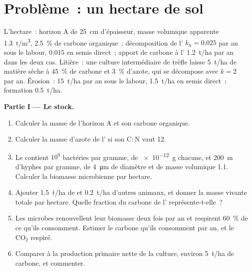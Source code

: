 \section{Problème~: un hectare de sol}

\begin{problem}
\label{pb:b2:living-soil:1}
L'hectare~: horizon A de \qty{25}{cm} d'épaisseur, masse volumique
apparente \qty{1.3}{t/m^3}, \qty{2.5}{\%} de carbone organique~;
décomposition de l' $k_h =
0.025$ par an sous le labour, $0.015$ en semis direct~; apport de carbone
à l' \qty{1.2}{t/ha} par an dans les deux cas. Litière~: une culture
intermédiaire de trèfle laisse \qty{5}{t/ha} de matière sèche à
\qty{45}{\%} de carbone et \qty{3}{\%} d'azote, qui se décompose avec $k = 2$
par an. Érosion~: \qty{15}{t/ha} par an sous le labour, \qty{1.5}{t/ha}
en semis direct~; formation \qty{0.5}{t/ha}.

\medskip
\noindent\textbf{Partie I --- Le stock.}
\begin{enumerate}
  \item Calculer la masse de l'horizon A et son carbone organique.
  \item Calculer la masse d'azote de l' si son
        $\mathrm{C:N}$ vaut 12.
  \item Le  contient $10^{9}$ bactéries par gramme, de \qty{e-12}{g}
        chacune, et \qty{200}{m} d'hyphes par gramme, de \qty{4}{\micro m}
        de diamètre et de masse volumique 1.1. Calculer la biomasse
        microbienne par hectare.
  \item Ajouter \qty{1.5}{t/ha} de  et \qty{0.2}{t/ha}
        d'autres animaux, et donner la masse vivante totale par hectare.
        Quelle fraction du carbone de l' représente-t-elle~?
  \item Les microbes renouvellent leur biomasse deux fois par an et
        respirent \qty{60}{\%} de ce qu'ils consomment. Estimer le carbone
        qu'ils consomment par an, et le $\mathrm{CO_2}$ respiré.
  \item Comparer à la production primaire nette de la culture, environ
        \qty{5}{t/ha} de carbone, et commenter.
\end{enumerate}


\end{problem}
